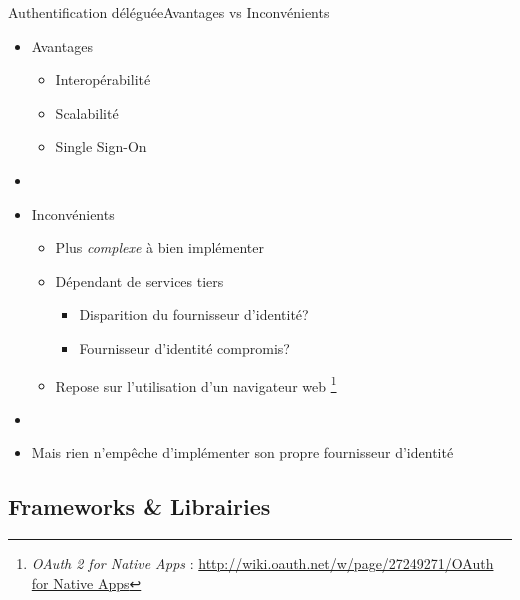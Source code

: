 \documentclass{beamer}
\begin{document}
\begin{frame}{Authentification déléguée}{Avantages vs Inconvénients}
  \begin{center}
    \begin{itemize}
      \item Avantages
      \begin{itemize}
        \item Interopérabilité
        \item Scalabilité
        \item Single Sign-On
      \end{itemize}
      \pause
      \item[~]
      \item Inconvénients
      \begin{itemize}
        \item Plus \emph{complexe} à bien implémenter
        \item Dépendant de services tiers
        \begin{itemize}
          \item Disparition du fournisseur d'identité?
          \item Fournisseur d'identité compromis?
        \end{itemize}
        \item {
          Repose sur l'utilisation d'un navigateur web
          \footnote[frame]{
            \emph{OAuth 2 for Native Apps} :
            \url{http://wiki.oauth.net/w/page/27249271/OAuth for Native Apps}
          }
        }
      \end{itemize}
      \pause
      \item[~]
      \item Mais rien n'empêche d'implémenter son propre fournisseur d'identité
    \end{itemize}
  \end{center}
\end{frame}

\subsection{Frameworks \& Librairies}
\end{document}
